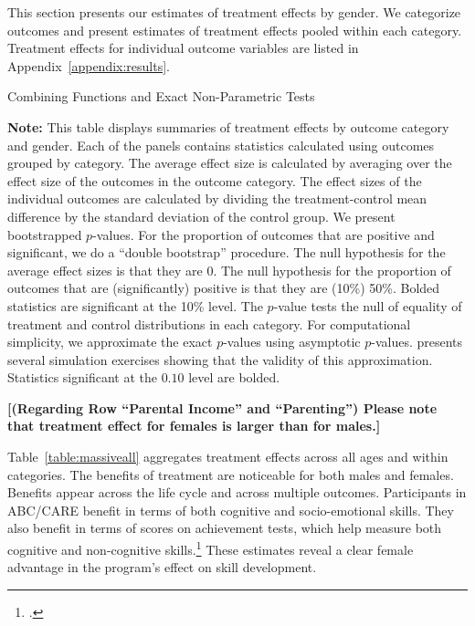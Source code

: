 This section presents our estimates of treatment effects by gender. We categorize outcomes and present estimates of treatment effects pooled within each category. Treatment effects for individual outcome variables are listed in Appendix~\ref{appendix:results}.

\begin{table}[!htpb]
\begin{threeparttable}
\caption{Combining Functions and Exact Non-Parametric Tests} \label{table:massiveall}
\centering

\begin{tablenotes}
\scriptsize
\item \textbf{Note:} This table displays summaries of treatment effects by outcome category and gender. Each of the panels contains statistics calculated using outcomes grouped by category. The average effect size is calculated by averaging over the effect size of the outcomes in the outcome category. The effect sizes of the individual outcomes are calculated by dividing the treatment-control mean difference by the standard deviation of the control group. We present bootstrapped $p$-values. For the proportion of outcomes that are positive and significant, we do a ``double bootstrap'' procedure. The null hypothesis for the average effect sizes is that they are 0. The null hypothesis for the proportion of outcomes that are (significantly) positive is that they are (10\%) 50\%. Bolded statistics are significant at the 10\% level. The \citet{Rosenbaum_2005_Distribution_JRSS} $p$-value tests the null of equality of treatment and control distributions in each category. For computational simplicity, we approximate the exact $p$-values using asymptotic $p$-values. \citet{Rosenbaum_2005_Distribution_JRSS} presents several simulation exercises showing that the validity of this approximation. Statistics significant at the $0.10$ level are bolded.
\end{tablenotes}
\end{threeparttable}
\textbf{[(Regarding Row ``Parental Income'' and ``Parenting'') Please note that treatment effect for females is larger than for males.]}
\end{table}

Table~\ref{table:massiveall} aggregates treatment effects across all ages and within categories. The benefits of treatment are noticeable for both males and females. Benefits appear across the life cycle and across multiple outcomes. Participants in ABC/CARE benefit in terms of both cognitive and socio-emotional skills. They also benefit in terms of scores on achievement tests, which help measure both cognitive and non-cognitive skills.\footnote{\citet{Almlund_Duckworth_etal_2011_ecoval}.} These estimates reveal a clear female advantage in the program's effect on skill development.

